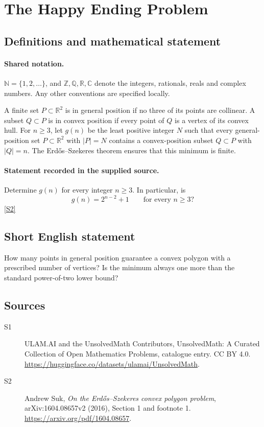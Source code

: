 \documentclass[11pt]{article}
\newcommand{\sref}[2]{\hyperlink{source:#1:#2}{[S#2]}}
\begin{document}
\section{The Happy Ending Problem}\label{statement}

\subsection{Definitions and mathematical statement}

\paragraph{Shared notation.}$\mathbb N=\{1,2,\ldots\}$, and $\mathbb Z,\mathbb Q,\mathbb R,\mathbb C$ denote the integers, rationals, reals and complex numbers. Any other conventions are specified locally.


A finite set $P\subset\mathbb R^2$ is in general position if no three of its points are collinear. A subset $Q\subset P$ is in convex position if every point of $Q$ is a vertex of its convex hull. For $n\geq3$, let $g(n)$ be the least positive integer $N$ such that every general-position set $P\subset\mathbb R^2$ with $|P|=N$ contains a convex-position subset $Q\subset P$ with $|Q|=n$. The Erd\H{o}s--Szekeres theorem ensures that this minimum is finite.
\paragraph{Statement recorded in the supplied source.}
Determine $g(n)$ for every integer $n\geq3$. In particular, is
\[
g(n)=2^{n-2}+1\qquad\text{for every }n\geq3?
\] \sref{statement}{2}

\subsection{Short English statement}
How many points in general position guarantee a convex polygon with a prescribed number of vertices? Is the minimum always one more than the standard power-of-two lower bound?
\subsection{Sources}
\begin{description}
\item[\hypertarget{source:statement:1}{S1}] ULAM.AI and the UnsolvedMath Contributors, UnsolvedMath: A Curated Collection of Open Mathematics Problems, catalogue entry. CC BY 4.0. \url{https://huggingface.co/datasets/ulamai/UnsolvedMath}.
\item[\hypertarget{source:statement:2}{S2}] Andrew Suk, \emph{On the Erd\H{o}s--Szekeres convex polygon problem}, arXiv:1604.08657v2 (2016), Section 1 and footnote 1. \url{https://arxiv.org/pdf/1604.08657}.
\end{description}
\label{end:statement}
\end{document}
